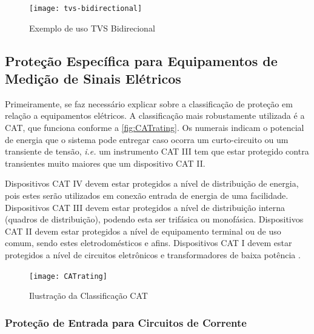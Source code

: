     \begin{figure}[htb!]%
        \caption{Exemplo de uso TVS Bidirecional}%
        \label{fig:tvsBidirecional}%
        \texttt{[image: tvs-bidirectional]}%
    \end{figure}

    \subsection{Proteção Específica para Equipamentos de Medição de Sinais Elétricos}\label{subsec:especProtec}

    Primeiramente, se faz necessário explicar sobre a classificação de proteção em relação a equipamentos elétricos. A classificação mais robustamente utilizada é a CAT, que funciona conforme a \autoref{fig:CATrating}. Os numerais indicam o potencial de energia que o sistema pode entregar caso ocorra um curto-circuito ou um transiente de tensão, \textit{i.e.} um instrumento CAT III tem que estar protegido contra transientes muito maiores que um dispositivo CAT II.  

    Dispositivos CAT IV devem estar protegidos a nível de distribuição de energia, pois estes serão utilizados em conexão entrada de energia de uma facilidade. Dispositivos CAT III devem estar protegidos a nível de distribuição interna (quadros de distribuição), podendo esta ser trifásica ou monofásica. Dispositivos CAT II devem estar protegidos a nível de equipamento terminal ou de uso comum, sendo estes eletrodomésticos e afins. Dispositivos CAT I devem estar protegidos a nível de circuitos eletrônicos e transformadores de baixa potência \cite{CATratingu}. %

    \begin{figure}[htb!]%
        \caption{Ilustração da Classificação CAT}%
        \label{fig:CATrating}%
        \texttt{[image: CATrating]}%
    \end{figure}


    
        \subsubsection{Proteção de Entrada para Circuitos de Corrente}\label{subsec:protecaoCorrente}


